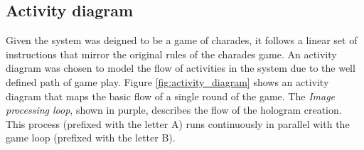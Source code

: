 \newpage

\subsection{Activity diagram}
\begin{figure}[h!]
\end{figure}
Given the system was deigned to be a game of charades, it follows a linear set of instructions that mirror the original rules of the charades game. An activity diagram was chosen to model the flow of activities in the system due to the well defined path of game play. Figure \ref{fig:activity_diagram} shows an activity diagram that maps the basic flow of a single round of the game. The \textit{Image processing loop}, shown in purple, describes the flow  of the hologram creation. This process (prefixed with the letter A) runs continuously in parallel with the game loop (prefixed with the letter B).

